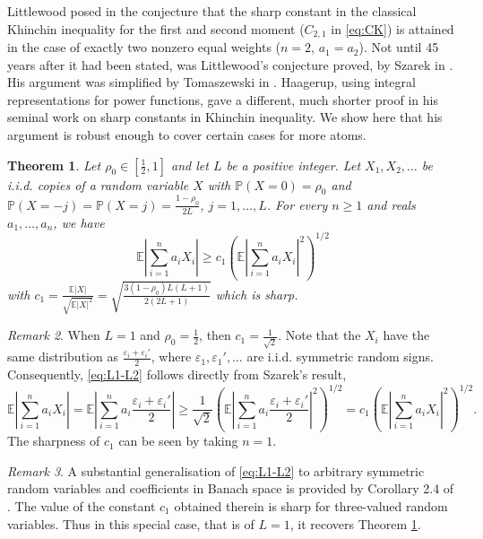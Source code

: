 \documentclass[10pt]{article}
\newcommand{\E}{\mathbb{E}}
\newcommand{\1}{\textbf{1}}
\newcommand{\p}[1]{\mathbb{P}\left( #1 \right)}
\newtheorem{theorem}{Theorem}
\theoremstyle{remark}
\newtheorem{remark}[theorem]{Remark}
\theoremstyle{definition}
\begin{document}
Littlewood posed in \cite{Lit} the conjecture that the sharp constant in the classical Khinchin inequality for the first and second moment ($C_{2,1}$ in \eqref{eq:CK}) is attained in the case of exactly two nonzero equal weights ($n=2$, $a_1 = a_2$). Not until 45 years after it had been stated, was Littlewood's conjecture proved, by Szarek in \cite{Sz}. His argument was simplified by Tomaszewski in \cite{Tom}. Haagerup, using integral representations for power functions, gave a different, much shorter proof in his seminal work \cite{Haa} on sharp constants in Khinchin inequality. We show here that his argument is robust enough to cover certain cases for more atoms.


\begin{theorem}\label{thm:L1-L2}
Let $\rho_0 \in [\frac{1}{2},1]$ and let $L$ be a positive integer. Let $X_1,X_2,\ldots$ be i.i.d. copies of a random variable $X$ with $\p{X = 0} = \rho_0$ and $\p{X = -j} = \p{X = j} = \frac{1-\rho_0}{2L}$, $j = 1, \ldots, L$. For every $n \geq 1$ and reals $a_1,\ldots,a_n$, we have
\begin{equation}\label{eq:L1-L2}
\E\left|\sum_{i=1}^n a_iX_i \right| \geq c_1\left(\E\left|\sum_{i=1}^n a_iX_i \right|^2\right)^{1/2} 
\end{equation}
with $c_1 = \frac{\E|X|}{\sqrt{\E|X|^2}} = \sqrt{\frac{3(1-\rho_0)L(L+1)}{2(2L+1)}}$ which is sharp.
\end{theorem}


\begin{remark}\label{rem:L1-L2}
When $L=1$ and $\rho_0 = \frac{1}{2}$, then $c_1 = \frac{1}{\sqrt{2}}$. Note that the $X_i$ have the same distribution as $\frac{\varepsilon_i+\varepsilon_i'}{2}$, where $\varepsilon_1,\varepsilon_1',\ldots$ are i.i.d. symmetric random signs. Consequently, \eqref{eq:L1-L2} follows directly from Szarek's result,
\[
\E\left|\sum_{i=1}^n a_iX_i \right| = \E\left|\sum_{i=1}^n a_i\frac{\varepsilon_i+\varepsilon_i'}{2} \right|\geq \frac{1}{\sqrt{2}}\left(\E\left|\sum_{i=1}^n a_i\frac{\varepsilon_i+\varepsilon_i'}{2} \right|^2\right)^{1/2} = c_1\left(\E\left|\sum_{i=1}^n a_iX_i \right|^2\right)^{1/2} .
\]
The sharpness of $c_1$ can be seen by taking $n=1$.
\end{remark}


\begin{remark}\label{rem:koles}
A substantial generalisation of \eqref{eq:L1-L2} to arbitrary symmetric random variables and coefficients in Banach space is provided by Corollary 2.4 of \cite{koles}. The value of the constant $c_1$ obtained therein is sharp for three-valued random variables. Thus in this special case, that is of $L=1$, it recovers Theorem \ref{thm:L1-L2}.
\end{remark}
\end{document}
